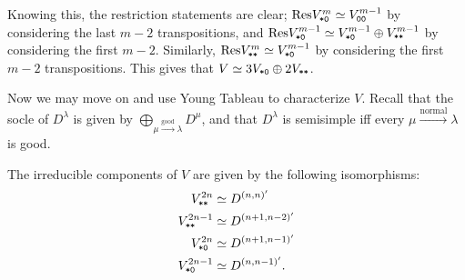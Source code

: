 \documentclass{amsart}
\begin{document}
Knowing this, the restriction statements are clear;
$\text{Res} V_{\texttt{*}\texttt{0}}^m \simeq V_{\texttt{0}\texttt{0}}^{m-1}$ by considering the last $m-2$ transpositions, and $\text{Res} V_{\texttt{*}\texttt{0}}^{m-1} \simeq V_{\texttt{*}\texttt{0}}^{m-1} \oplus V_{\texttt{*}\texttt{*}}^{m-1}$ by considering the first $m-2$.
Similarly, $\text{Res} V_{\texttt{*}\texttt{*}}^m \simeq V_{\texttt{*}\texttt{0}}^{m-1}$ by considering the first $m-2$ transpositions.
This gives that $V \simeq 3V_{\texttt{*}\texttt{0}} \oplus 2V_{\texttt{*}\texttt{*}}$.

Now we may move on and use Young Tableau to characterize $V$.
Recall that the socle of $D^\lambda$ is given by $\bigoplus\limits_{\mu \xrightarrow{\text{good}} \lambda} D^\mu$,  and that $D^\lambda$ is semisimple iff every $\mu \xrightarrow{\text{normal}} \lambda$ is good.
\begin{theorem}
  The irreducible components of $V$ are given by the following isomorphisms:
     \begin{align*}  
      V^{2n}_{\texttt{*}\texttt{*}} &\simeq D^{(n,n)'}\\ 
      V^{2n-1}_{\texttt{*}\texttt{*}} &\simeq D^{(n+1,n-2)'}\\
      V^{2n}_{\texttt{*}\texttt{0}} &\simeq D^{(n+1,n-1)'}\\
      V^{2n-1}_{\texttt{*}\texttt{0}} &\simeq D^{(n,n-1)'}.
     \end{align*}
\end{theorem}
\end{document}
